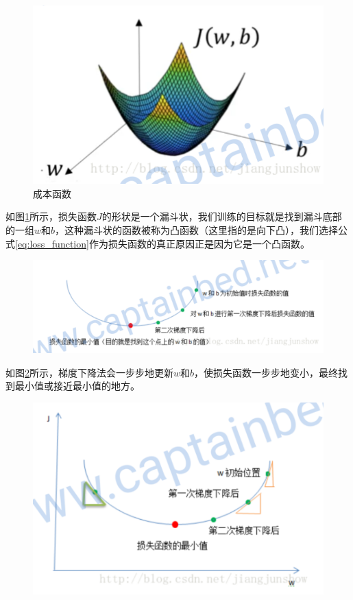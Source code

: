 \documentclass[UTF-8]{article} %
\begin{document}
	\begin{figure}[htb]
		\centering
		\includegraphics[width=0.7\linewidth]{pictures/成本/lost}
		\caption{成本函数}
		\label{fig:lost}
	\end{figure}

	如图\ref{fig:lost}所示，损失函数$J$的形状是一个漏斗状，我们训练的目标就是找到漏斗底部的一组$w$和$b$，这种漏斗状的函数被称为凸函数（这里指的是向下凸），我们选择公式\ref{eq:loss_function}作为损失函数的真正原因正是因为它是一个凸函数。

	\begin{figure}[htb]
		\centering
		\includegraphics[width=0.7\linewidth]{pictures/梯度下降法/gradient_descent1}
		\caption{}
		\label{fig:gradient_descent1}
	\end{figure}
	
	如图\ref{fig:gradient_descent1}所示，梯度下降法会一步步地更新$w$和$b$，使损失函数一步步地变小，最终找到最小值或接近最小值的地方。
	\begin{figure}[htb]
		\centering
		\includegraphics[width=0.7\linewidth]{pictures/梯度下降法/gradient_descent2}
		\caption{}
		\label{fig:gradient_descent2}
	\end{figure}
	
\end{document}
